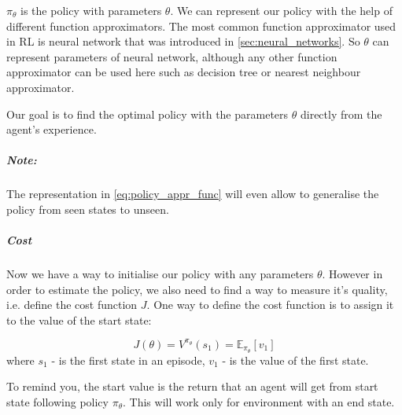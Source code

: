 $\pi_{\theta}$ is the policy with parameters $\theta$. We can represent our policy
with the help of different function approximators. The most common function
approximator used in RL is neural network that was introduced in \autoref{sec:neural_networks}.
So $\theta$ can represent parameters of neural network, although any other function approximator
can be used here such as decision tree or nearest neighbour approximator.

Our goal is to find the optimal policy with the parameters $\theta$
directly from the agent's experience.


\subparagraph{Note:}
The representation in \ref{eq:policy_appr_func} will even allow to generalise
the policy from seen states to unseen.

%








\subparagraph{Cost} Now we have a way to initialise our policy with any parameters $\theta$.
However in order to estimate the policy, we also need to find a way
to measure it's quality, i.e. define the cost function $J$.
One way to define the cost function is to assign it
to the value of the start state:

\begin{equation}
	J(\theta) = V^{\pi_{\theta}}(s_1) = \mathbb{E}_{\pi_{\theta}} [v_1]
\end{equation}
where $s_1$ - is the first state in an episode, $v_1$ - is the value
of the first state.



To remind you, the start value is the return that an agent will get from start state
following policy $\pi_{\theta}$. This will work only for environment with an end state.


